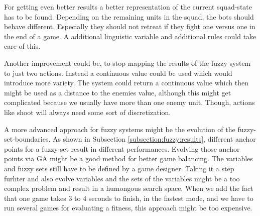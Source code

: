 For getting even better results a better representation of the current squad-state has to be found. Depending on the remaining units in the squad, the bots should behave different. Especially they should not retreat if they fight one versus one in the end of a game. A additional linguistic variable and additional rules could take care of this.

Another improvement could be, to stop mapping the results of the fuzzy system to just two actions. Instead a continuous value could be used which would introduce more variety. The system could return a continuous value which then might be used as a distance to the enemies value, although this might get complicated because we usually have more than one enemy unit. Though, actions like shoot will always need some sort of discretization.

A more advanced approach for fuzzy systems might be the evolution of the fuzzy-set-boundaries. As shown in Subsection \ref{subsection:fuzzy:results}, different anchor points for a fuzzy-set result in different performances. Evolving those anchor points via GA might be a good method for better game balancing. The variables and fuzzy sets still have to be defined by a game designer.
Taking it a step furhter and also evolve variables and the sets of the variables might be a too complex problem and result in a humongous search space. When we add the fact that one game takes $3$ to $4$ seconds to finish, in the fastest mode, and we have to run several games for evaluating a fitness, this approach might be too expensive. 
%